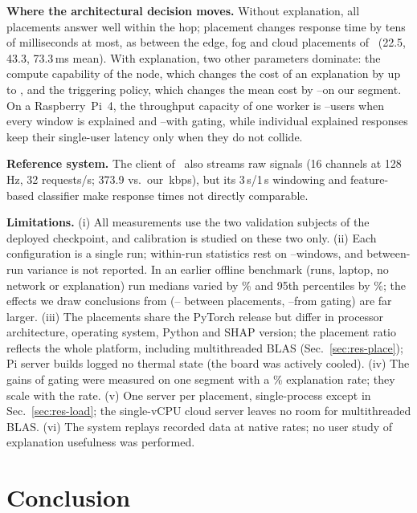 \documentclass[conference]{IEEEtran}
\newcommand{\ms}{\,ms\xspace}
\begin{document}
\textbf{Where the architectural decision moves.} Without explanation, all
placements answer well within the hop; placement changes response time by
tens of milliseconds at most, as between the edge, fog and cloud
placements of~\cite{erzurumluoglu2025} (22.5, 43.3, 73.3\ms mean). With explanation, two other
parameters dominate: the compute capability of the node, which changes the
cost of an explanation by up to \FogOverColocXaiShap\x, and the triggering
policy, which changes the mean cost by
\SelExecGainMin--\SelExecGainMax\x on our segment. On a Raspberry~Pi~4,
the throughput capacity of one worker
is \FogODShapCCap--\FogODLimeCCap users when every window is explained and
\SelShapCCap--\SelLimeCCap with gating, while individual explained
responses keep their single-user latency only when they do not collide.

\textbf{Reference system.} The client of~\cite{erzurumluoglu2025} also
streams raw signals (16 channels at 128\,Hz, 32 requests/s; 373.9 vs.\
our \KbpsAll\,kbps), but its 3\,s/1\,s windowing and feature-based
classifier make response times not directly comparable.

\textbf{Limitations.} (i) All measurements use the two validation subjects
of the deployed checkpoint, and calibration is studied on these two only.
(ii) Each configuration is a single run; within-run statistics rest on
\LoadOneN--\SelShapCN windows, and between-run variance is not reported.
In an earlier offline benchmark (\RepeatRuns runs, laptop, no network or
explanation) run medians varied by \RepeatSpread\% and 95th percentiles by
\RepeatSpreadPNF\%; the effects we draw conclusions from (\FogOverColocXaiLimeC--\FogOverColocXaiShap\x
between placements, \SelExecGainMin--\SelExecGainMax\x from gating) are far
larger. (iii) The placements share the PyTorch release but differ in
processor architecture, operating system, Python and SHAP version; the
placement ratio reflects the whole platform, including multithreaded BLAS
(Sec.~\ref{sec:res-place}); Pi server builds logged no thermal state
(the board was actively cooled).
(iv) The gains of gating were measured on one segment with a
\SelShapCRate\% explanation rate; they scale with the rate.
(v) One server per placement, single-process except in
Sec.~\ref{sec:res-load}; the single-vCPU cloud server leaves no room for
multithreaded BLAS. (vi) The system replays recorded data at native rates; no user study
of explanation usefulness was performed.

\section{Conclusion}
\end{document}
